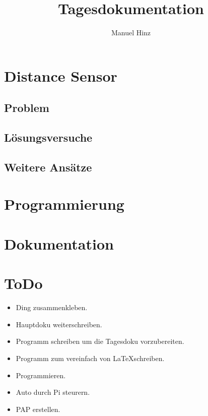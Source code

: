 \documentclass{article}
\author{Manuel Hinz}
\title{Tagesdokumentation}
\begin{document}
\maketitle

\section{Distance Sensor}

\subsection{Problem}

\subsection{Lösungsversuche}

\subsection{Weitere Ansätze}

\section{Programmierung}

\section{Dokumentation}

\section{ToDo}

\begin{itemize}

\item Ding zusammenkleben.

\item Hauptdoku weiterschreiben.

\item Programm schreiben um die Tagesdoku vorzubereiten.

\item Programm zum vereinfach von \LaTeX schreiben.

\item Programmieren.

\item Auto durch Pi steurern.

\item PAP erstellen.

\end{itemize}
\end{document}
